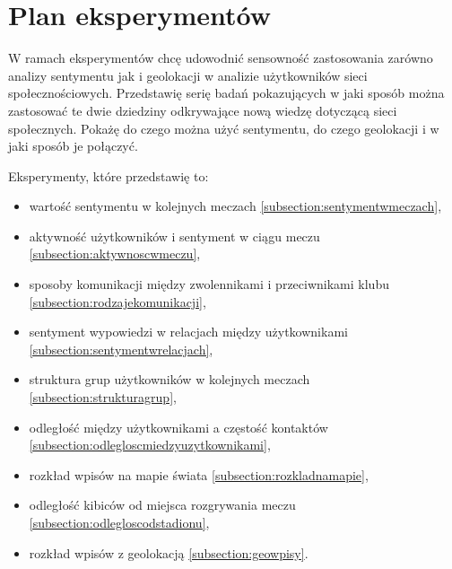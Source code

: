 




















\section{Plan eksperymentów}
W ramach eksperymentów chcę udowodnić sensowność zastosowania zarówno
analizy sentymentu jak i geolokacji w analizie użytkowników sieci 
społecznościowych. Przedstawię serię badań pokazujących w jaki sposób
można zastosować te dwie dziedziny odkrywające nową wiedzę dotyczącą sieci
społecznych. Pokażę do czego można użyć sentymentu, do czego geolokacji
i w jaki sposób je połączyć.

Eksperymenty, które przedstawię to:
\begin{itemize}
  \item wartość sentymentu w kolejnych meczach 
  \ref{subsection:sentymentwmeczach},
  
  \item aktywność użytkowników i sentyment w ciągu meczu
  \ref{subsection:aktywnoscwmeczu},
  
  \item sposoby komunikacji między zwolennikami i przeciwnikami klubu 
  \ref{subsection:rodzajekomunikacji},
  
  \item sentyment wypowiedzi w relacjach między użytkownikami
  \ref{subsection:sentymentwrelacjach},
  
  \item struktura grup użytkowników w kolejnych meczach
  \ref{subsection:strukturagrup},
  
  \item odległość między użytkownikami a częstość kontaktów
  \ref{subsection:odlegloscmiedzyuzytkownikami},
  
  \item rozkład wpisów na mapie świata
  \ref{subsection:rozkladnamapie},
  
  \item odległość kibiców od miejsca rozgrywania meczu
  \ref{subsection:odlegloscodstadionu},
  
  \item rozkład wpisów z geolokacją
  \ref{subsection:geowpisy}.
\end{itemize}

